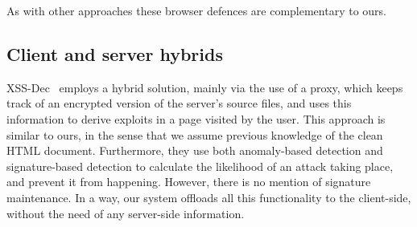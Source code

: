 As with other approaches these browser defences are complementary to ours.

\subsection{Client and server hybrids}

XSS-Dec~\cite{Sundareswaran:2012:XHS:2352970.2352994} employs a hybrid solution, mainly via the use of a proxy, which keeps track of an encrypted version of the server's source files, and uses this information to derive exploits in a page visited by the user. This approach is similar to ours, in the sense that we assume previous knowledge of the clean HTML document. Furthermore, they use both anomaly-based detection and signature-based detection to calculate the likelihood of an attack taking place, and prevent it from happening. However, there is no mention of signature maintenance. In a way, our system offloads all this functionality to the client-side, without the need of any server-side information.

